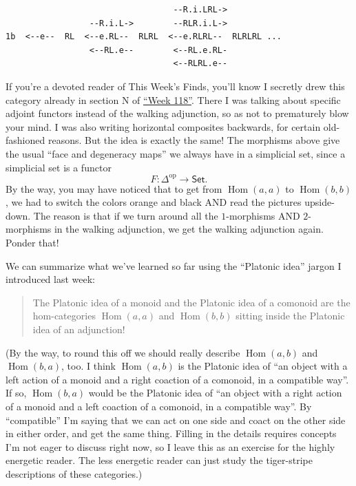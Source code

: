 \documentclass{article}
\begin{document}
\begin{verbatim}
                                  --R.i.LRL->
                 --R.i.L->        --RLR.i.L->
1b  <--e--  RL  <--e.RL--  RLRL  <--e.RLRL--  RLRLRL ...
                 <--RL.e--        <--RL.e.RL-
                                  <--RLRL.e--
\end{verbatim}

If you're a devoted reader of This Week's Finds, you'll know I secretly
drew this category already in section N of
\protect\hyperlink{week118}{``Week 118''}. There I was talking about
specific adjoint functors instead of the walking adjunction, so as not
to prematurely blow your mind. I was also writing horizontal composites
backwards, for certain old-fashioned reasons. But the idea is exactly
the same! The morphisms above give the usual ``face and degeneracy
maps'' we always have in a simplicial set, since a simplicial set is a
functor \[F\colon \Delta^{\mathrm{op}} \to \mathsf{Set}.\] By the way,
you may have noticed that to get from \(\operatorname{Hom}(a,a)\) to
\(\operatorname{Hom}(b,b)\), we had to switch the colors orange and
black AND read the pictures upside-down. The reason is that if we turn
around all the \(1\)-morphisms AND \(2\)-morphisms in the walking
adjunction, we get the walking adjunction again. Ponder that!

We can summarize what we've learned so far using the ``Platonic idea''
jargon I introduced last week:

\begin{quote}
The Platonic idea of a monoid and the Platonic idea of a comonoid are
the hom-categories \(\operatorname{Hom}(a,a)\) and
\(\operatorname{Hom}(b,b)\) sitting inside the Platonic idea of an
adjunction!
\end{quote}

(By the way, to round this off we should really describe
\(\operatorname{Hom}(a,b)\) and \(\operatorname{Hom}(b,a)\), too. I
think \(\operatorname{Hom}(a,b)\) is the Platonic idea of ``an object
with a left action of a monoid and a right coaction of a comonoid, in a
compatible way''. If so, \(\operatorname{Hom}(b,a)\) would be the
Platonic idea of ``an object with a right action of a monoid and a left
coaction of a comonoid, in a compatible way''. By ``compatible'' I'm
saying that we can act on one side and coact on the other side in either
order, and get the same thing. Filling in the details requires concepts
I'm not eager to discuss right now, so I leave this as an exercise for
the highly energetic reader. The less energetic reader can just study
the tiger-stripe descriptions of these categories.)
\end{document}

